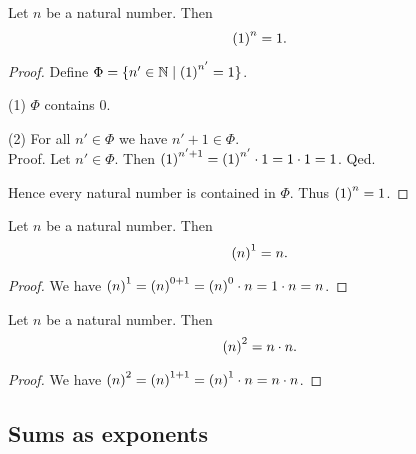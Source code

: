 \documentclass[../arithmetic.tex]{subfiles}
\begin{document}
  \begin{forthel}
    \begin{proposition}
      Let $n$ be a natural number.
      Then \[ \left(1\right)^{n} = 1. \]
    \end{proposition}
    \begin{proof}
      Define $\Phi = \{ n' \in \mathbb{N} \mid \left(1\right)^{n'} = 1 \}$.

      (1) $\Phi$ contains $0$.

      (2) For all $n' \in \Phi$ we have $n' \plus 1 \in \Phi$. \\
      Proof.
        Let $n' \in \Phi$.
        Then $\left(1\right)^{n' + 1}
          = \left(1\right)^{n'} \cdot 1
          = 1 \cdot 1
          = 1$.
      Qed.

      Hence every natural number is contained in $\Phi$.
      Thus $\left(1\right)^{n} = 1$.
    \end{proof}
  \end{forthel}

  \begin{forthel}
    \begin{proposition}
      Let $n$ be a natural number.
      Then \[ \left(n\right)^{1} = n. \]
    \end{proposition}
    \begin{proof}
      We have $\left(n\right)^{1}
        = \left(n\right)^{0 + 1}
        = \left(n\right)^{0} \cdot n
        = 1 \cdot n
        = n$.
    \end{proof}
  \end{forthel}

  \begin{forthel}
    \begin{proposition}
      Let $n$ be a natural number.
      Then \[ \left(n\right)^{2} = n \cdot n. \]
    \end{proposition}
    \begin{proof}
      We have $\left(n\right)^{2}
        = \left(n\right)^{1 + 1}
        = \left(n\right)^{1} \cdot n
        = n \cdot n$.
    \end{proof}
  \end{forthel}


  \subsection*{Sums as exponents}
\end{document}
